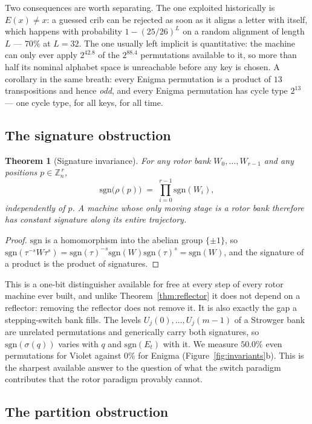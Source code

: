 \documentclass[11pt]{article}
\newtheorem{theorem}{Theorem}
\theoremstyle{definition}
\newcommand{\sgn}{\mathrm{sgn}}
\newcommand{\ZZ}{\mathbb{Z}}
\begin{document}
Two consequences are worth separating. The one exploited historically is
$E(x)\neq x$: a guessed crib can be rejected as soon as it aligns a letter with
itself, which happens with probability $1-(25/26)^{L}$ on a random alignment of
length $L$ --- $70\%$ at $L=32$. The one usually left implicit is quantitative:
the machine can only ever apply $2^{42.8}$ of the $2^{88.4}$ permutations
available to it, so more than half its nominal alphabet space is unreachable
before any key is chosen. A corollary in the same breath: every Enigma
permutation is a product of $13$ transpositions and hence \emph{odd}, and every
Enigma permutation has cycle type $2^{13}$ --- one cycle type, for all keys, for
all time.

\subsection{The signature obstruction}

\begin{theorem}[Signature invariance]\label{thm:signature}
For any rotor bank $W_0,\dots,W_{r-1}$ and any positions $p \in \ZZ_n^{\,r}$,
\[
  \sgn\bigl(\rho(p)\bigr) \;=\; \prod_{i=0}^{r-1}\sgn(W_i),
\]
independently of $p$. A machine whose only moving stage is a rotor bank
therefore has constant signature along its entire trajectory.
\end{theorem}

\begin{proof}
$\sgn$ is a homomorphism into the abelian group $\{\pm1\}$, so
$\sgn(\tau^{-s}W\tau^{s}) = \sgn(\tau)^{-s}\sgn(W)\sgn(\tau)^{s} = \sgn(W)$, and
the signature of a product is the product of signatures.
\end{proof}

This is a one-bit distinguisher available for free at every step of every rotor
machine ever built, and unlike Theorem~\ref{thm:reflector} it does not depend on
a reflector: removing the reflector does not remove it. It is also exactly the
gap a stepping-switch bank fills. The levels $U_j(0),\dots,U_j(m-1)$ of a
Strowger bank are unrelated permutations and generically carry both signatures,
so $\sgn(\sigma(q))$ varies with $q$ and $\sgn(E_t)$ with it. We measure
$50.0\%$ even permutations for Violet against $0\%$ for Enigma
(Figure~\ref{fig:invariants}b). This is the sharpest available answer to the
question of what the switch paradigm contributes that the rotor paradigm
provably cannot.

\subsection{The partition obstruction}
\end{document}
